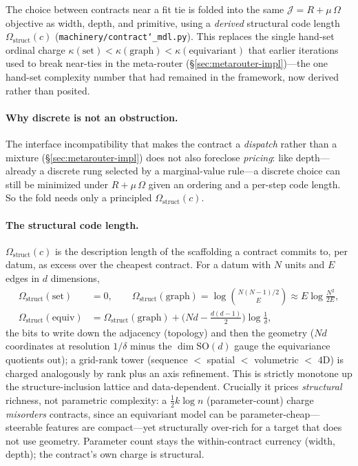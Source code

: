 \documentclass[11pt]{article}
\newcommand{\allowbreakhere}{\discretionary{}{}{}}
\newcommand{\code}[1]{\texttt{\def\_{\char`_\allowbreakhere}#1}}
\begin{document}
The choice between contracts near a fit tie is folded into the same $\mathcal J=R+\mu\,\Omega$ objective as
width, depth, and primitive, using a \emph{derived} structural code length $\Omega_{\mathrm{struct}}(c)$
(\code{machinery/contract\_mdl.py}). This replaces the single hand-set ordinal charge
$\kappa(\text{set})<\kappa(\text{graph})<\kappa(\text{equivariant})$ that earlier iterations used to break
near-ties in the meta-router (\S\ref{sec:metarouter-impl})---the one hand-set complexity number that had
remained in the framework, now derived rather than posited.

\paragraph{Why discrete is not an obstruction.} The interface incompatibility that makes the contract a
\emph{dispatch} rather than a mixture (\S\ref{sec:metarouter-impl}) does not also foreclose
\emph{pricing}: like depth---already a discrete rung selected by a marginal-value rule---a discrete choice
can still be minimized under $R+\mu\,\Omega$ given an ordering and a per-step code length. So the fold
needs only a principled $\Omega_{\mathrm{struct}}(c)$.

\paragraph{The structural code length.} $\Omega_{\mathrm{struct}}(c)$ is the description length of the
scaffolding a contract commits to, per datum, as excess over the cheapest contract. For a datum with $N$
units and $E$ edges in $d$ dimensions,
\begin{equation*}
\begin{aligned}
\Omega_{\mathrm{struct}}(\text{set})&=0,\qquad
\Omega_{\mathrm{struct}}(\text{graph})=\log\binom{N(N-1)/2}{E}\approx E\log\tfrac{N^2}{2E},\\
\Omega_{\mathrm{struct}}(\text{equiv})&=\Omega_{\mathrm{struct}}(\text{graph})+\big(Nd-\tfrac{d(d-1)}2\big)\log\tfrac1\delta,
\end{aligned}
\end{equation*}
the bits to write down the adjacency (topology) and then the geometry ($Nd$ coordinates at resolution
$1/\delta$ minus the $\dim\mathrm{SO}(d)$ gauge the equivariance quotients out); a grid-rank tower
(sequence $<$ spatial $<$ volumetric $<$ $4$D) is charged analogously by rank plus an axis refinement.
This is strictly monotone up the structure-inclusion lattice and data-dependent. Crucially it prices
\emph{structural} richness, not parametric complexity: a $\tfrac12 k\log n$ (parameter-count) charge
\emph{misorders} contracts, since an equivariant model can be parameter-cheap---steerable features are
compact---yet structurally over-rich for a target that does not use geometry. Parameter count stays the
within-contract currency (width, depth); the contract's own charge is structural.
\end{document}
